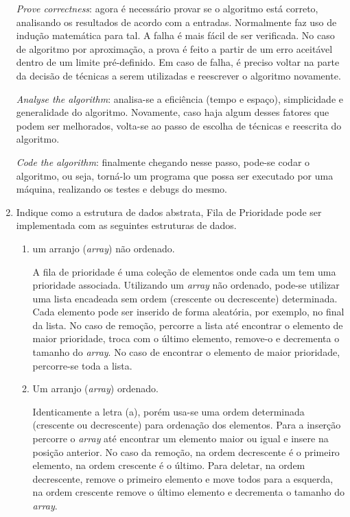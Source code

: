 \documentclass[12pt,a4paper]{article}
\begin{document}
\begin{enumerate}
	\textit{Prove correctness}: agora é necessário provar se o algoritmo está correto, analisando os resultados de acordo com a entradas. Normalmente faz uso de indução matemática para tal. A falha é mais fácil de ser verificada. No caso de algoritmo por aproximação, a prova é feito a partir de um erro aceitável dentro de um limite pré-definido. Em caso de falha, é preciso voltar na parte da decisão de técnicas a serem utilizadas e reescrever o algoritmo novamente.
	
	\textit{Analyse the algorithm}: analisa-se a eficiência (tempo e espaço), simplicidade e generalidade do algoritmo. Novamente, caso haja algum desses fatores que podem ser melhorados, volta-se ao passo de escolha de técnicas e reescrita do algoritmo.
	
	\textit{Code the algorithm}: finalmente chegando nesse passo, pode-se codar o algoritmo, ou seja, torná-lo um programa que possa ser executado por uma máquina, realizando os testes e debugs do mesmo.
	
	
	
	\item Indique como a estrutura de dados abstrata, Fila de Prioridade pode ser implementada com as seguintes estruturas de dados.
	\begin{enumerate}
		\item um arranjo (\textit{array}) não ordenado.
		
		A fila de prioridade é uma coleção de elementos onde cada um tem uma prioridade associada. Utilizando um \textit{array} não ordenado, pode-se utilizar uma lista encadeada sem ordem  (crescente ou decrescente) determinada. Cada elemento pode ser inserido de forma aleatória, por exemplo, no final da lista. No caso de remoção, percorre a lista até encontrar o elemento de maior prioridade, troca com o último elemento, remove-o e decrementa o tamanho do \textit{array}. No caso de encontrar o elemento de maior prioridade, percorre-se toda a lista. 
	 
		\item Um arranjo (\textit{array}) ordenado.
		
		Identicamente a letra (a), porém usa-se uma ordem determinada (crescente ou decrescente) para ordenação dos elementos. Para a inserção percorre o \textit{array} até encontrar um elemento maior ou igual e insere na posição anterior. No caso da remoção, na ordem decrescente é o primeiro elemento, na ordem crescente é o último. Para deletar, na ordem decrescente, remove o primeiro elemento e move todos para a esquerda, na ordem crescente remove o último elemento e decrementa o tamanho do \textit{array}.
		

\end{enumerate}
\end{enumerate}
\end{document}
